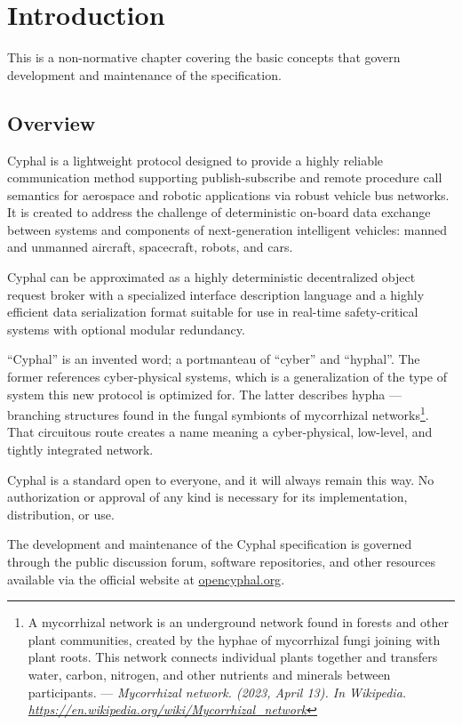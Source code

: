 \chapter{Introduction}\label{sec:introduction}

This is a non-normative chapter covering the basic concepts that govern development and maintenance of
the specification.

\section{Overview}

Cyphal is a lightweight protocol designed to provide a highly reliable communication method
supporting publish-subscribe and remote procedure call semantics
for aerospace and robotic applications via robust vehicle bus networks.
It is created to address the challenge of deterministic on-board data exchange between systems and components
of next-generation intelligent vehicles: manned and unmanned aircraft, spacecraft, robots, and cars.

Cyphal can be approximated as a highly deterministic decentralized object request broker
with a specialized interface description language and a highly efficient data serialization format
suitable for use in real-time safety-critical systems with optional modular redundancy.

``Cyphal'' is an invented word; a portmanteau of ``cyber'' and ``hyphal''.
The former references cyber-physical systems,
which is a generalization of the type of system this new protocol is optimized for.
The latter describes hypha --- branching structures found in the fungal symbionts of mycorrhizal networks\footnote{%
    A mycorrhizal network is an underground network found in forests and other plant communities,
    created by the hyphae of mycorrhizal fungi joining with plant roots.
    This network connects individual plants together and transfers water, carbon, nitrogen,
    and other nutrients and minerals between participants.
    ---
    \emph{Mycorrhizal network. (2023, April 13). In Wikipedia. \url{https://en.wikipedia.org/wiki/Mycorrhizal_network}}
}.
That circuitous route creates a name meaning a cyber-physical, low-level, and tightly integrated network.

Cyphal is a standard open to everyone, and it will always remain this way.
No authorization or approval of any kind is necessary for its implementation, distribution, or use.

The development and maintenance of the Cyphal specification is governed through the public discussion forum,
software repositories, and other resources available via the official website at
\href{http://opencyphal.org}{opencyphal.org}.

